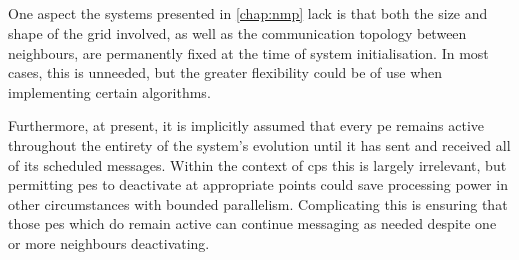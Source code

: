




\subsection{}

One aspect the systems presented in \cref{chap:nmp} lack is that both the size and shape of the grid involved, as well as the communication topology between neighbours, are permanently fixed at the time of system initialisation.  In most cases, this is unneeded, but the greater flexibility could be of use when implementing certain algorithms.

Furthermore, at present, it is implicitly assumed that every \gls{pe} remains active throughout the entirety of the system's evolution until it has sent and received all of its scheduled messages.  Within the context of \gls{cps} this is largely irrelevant, but permitting \glspl{pe} to deactivate at appropriate points could save processing power in other circumstances with bounded parallelism.  Complicating this is ensuring that those \glspl{pe} which do remain active can continue messaging as needed despite one or more neighbours deactivating.


